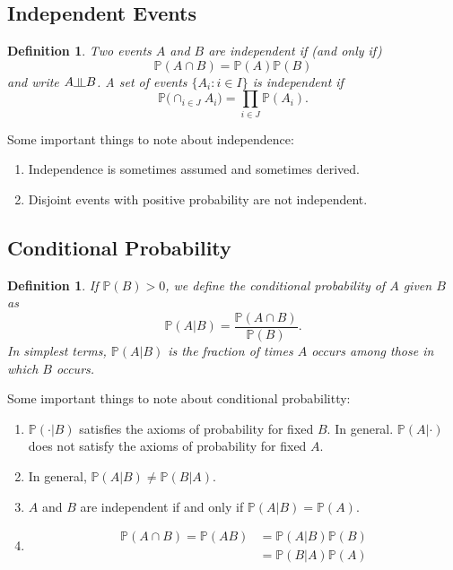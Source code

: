 \documentclass{article}
\newtheorem{definition}[counter]{Definition}
\theoremstyle{remark}
\newcommand{\1}{\mathbf{1}}
\newcommand{\Prob}{\mathbb{P}}
\newcommand{\indep}{\rotatebox[origin=c]{90}{$\models$}}
\begin{document}
\subsection{Independent Events}
\begin{definition}
	Two events $A$ and $B$ are independent if (and only if)
	\[
	\Prob(A \cap B) = \Prob(A)\Prob(B)
	\]
	and write $A \indep B$. A set of events $\{A_i : i \in I\}$ is independent if
 	\[
 	\Prob\Bigg(\cap_{i \in J}A_i\Bigg)	= \prod_{i \in J}\Prob(A_i) .
 	\]
\end{definition}
\space
\noindent Some important things to note about independence:
\begin{enumerate}
	\item Independence is sometimes assumed and sometimes derived.
	\item Disjoint events with positive probability are not independent.
\end{enumerate}

\subsection{Conditional Probability}
\begin{definition}
	If $\Prob(B)>0$, we define the conditional probability of $A$ given $B$ as
	\[
	\Prob(A|B) = \frac{\Prob(A \cap B)}{\Prob(B)}.
	\]
	In simplest terms, $\Prob(A|B)$ is the fraction of times $A$ occurs among those in which $B$ occurs.
\end{definition}
\noindent Some important things to note about conditional probabilitty:
\begin{enumerate}
	\item $\Prob(\cdot|B)$ satisfies the axioms of probability for fixed $B$. In general. $\Prob(A|\cdot)$ does not satisfy the axioms of probability for fixed $A$.
	\item In general, $\Prob(A|B) \neq \Prob(B|A)$.
	\item $A$ and $B$ are independent if and only if $\Prob(A|B) = \Prob(A)$.
	\item \[
	\begin{split}
	\Prob(A \cap B) = \Prob(AB) &= \Prob(A|B)\Prob(B) \\
				&= \Prob(B|A)\Prob(A)
	\end{split}
	\]
\end{enumerate}
\end{document}
